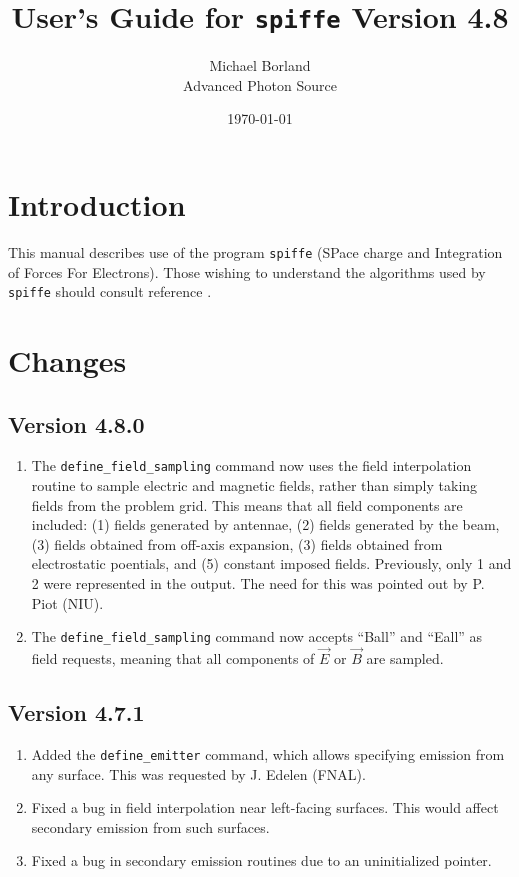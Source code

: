 \documentclass[11pt]{article}
\begin{document}
\title{User's Guide for {\tt spiffe} Version 4.8}
\author{Michael Borland\\Advanced Photon Source\\ \date{\today}}
\maketitle

\section{Introduction}

This manual describes use of the program {\tt spiffe} (SPace charge and
Integration of Forces For Electrons).  Those wishing to understand the
algorithms used by {\tt spiffe} should consult reference \cite{spiffeEqn}.

\section{Changes}
\subsection{Version 4.8.0}

\begin{enumerate}
\item The \verb|define_field_sampling| command now uses the field interpolation routine to sample
  electric and magnetic fields, rather than simply taking fields from the problem grid. This means that
  all field components are included: (1) fields generated by antennae, (2) fields generated by the beam,
  (3) fields obtained from off-axis expansion, (3) fields obtained from electrostatic poentials, and (5) constant
  imposed fields. Previously, only 1 and 2 were represented in the output.
  The need for this was pointed out by P. Piot (NIU).
\item The \verb|define_field_sampling| command now accepts ``Ball'' and ``Eall'' as field requests, meaning
  that all components of $\vec{E}$ or $\vec{B}$ are sampled.
\end{enumerate}


\subsection{Version 4.7.1}
\begin{enumerate}
\item Added the \verb|define_emitter| command, which allows specifying emission from any
  surface. This was requested by J. Edelen (FNAL).
\item Fixed a bug in field interpolation near left-facing surfaces. This would affect secondary emission from such surfaces.
\item Fixed a bug in secondary emission routines due to an uninitialized pointer.
\end{enumerate}
\end{document}
